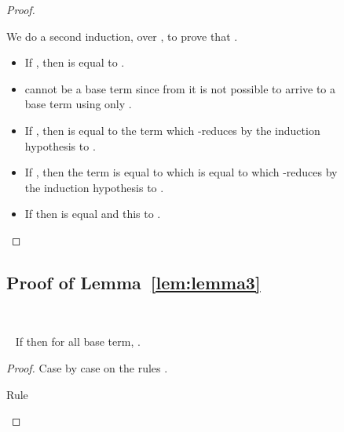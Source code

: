 \documentclass{LMCS}
\newcommand{\recap}[2]{\medskip\noindent{\bf #1 \ref{#2}.}~}
\begin{document}
\begin{figure}
{\begin{proof}
\begin{description}
\begin{itemize}
\begin{itemize}
	      We do a second induction, over , to prove that .
	      \begin{itemize} 
		\item If , then  is equal to .
		\item  cannot be a base term since from  it is not possible to arrive to a base term using only .
		\item If , then  is equal to the term  which -reduces by the induction hypothesis to .
		\item If , then the term  is equal to  which is equal to  which -reduces by the induction hypothesis to .
		\item If  then  is equal  and this to .\qedhere
	      \end{itemize}
	  \end{itemize}
      \end{itemize}
  \end{description} 
\end{proof}

\subsection{Proof of Lemma~\ref{lem:lemma3}}\label{proof:lemma3}~

\recap{Lemma}{lem:lemma3}
If  then for all  base term, .
\begin{proof}
  Case by case on the rules .
  \begin{description}
    \item[Rule ]
      
      
      
      
      

\end{description}
\end{proof}}
\end{figure}
\end{document}
